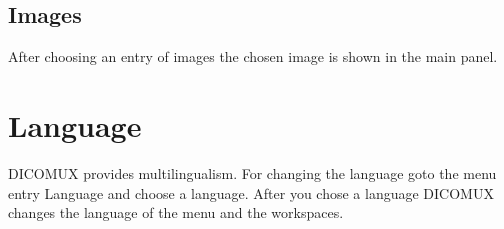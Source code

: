 	\subsection{Images}
	After choosing an entry of images the chosen image is shown in the main
	panel.\\
	
	\begin{minipage}{\textwidth} 
	\centering
	\label{fig:bild}
	\end{minipage}
	
\section{Language}
DICOMUX provides multilingualism. For changing the language goto the menu entry
Language and choose a language. After you chose a language DICOMUX changes the
language of the menu and the workspaces.\\

\begin{minipage}{\textwidth} 
\centering
{}
\label{fig:bild}
\end{minipage}

%
%